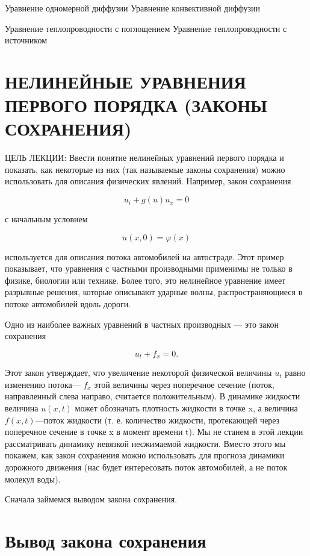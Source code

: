 \documentclass[
  ukrainian,
]{article}
\begin{document}
Уравнение одномерной диффузии Уравнение конвективной диффузии

Уравнение теплопроводности с поглощением Уравнение теплопроводности с
источником

\section{НЕЛИНЕЙНЫЕ УРАВНЕНИЯ ПЕРВОГО ПОРЯДКА (ЗАКОНЫ
СОХРАНЕНИЯ)}\label{ux43dux435ux43bux438ux43dux435ux439ux43dux44bux435-ux443ux440ux430ux432ux43dux435ux43dux438ux44f-ux43fux435ux440ux432ux43eux433ux43e-ux43fux43eux440ux44fux434ux43aux430-ux437ux430ux43aux43eux43dux44b-ux441ux43eux445ux440ux430ux43dux435ux43dux438ux44f}

ЦЕЛЬ ЛЕКЦИИ: Ввести понятие нелинейных уравнений первого порядка и
показать, как некоторые из них (так называемые законы сохранения) можно
использовать для описания физических явлений. Например, закон сохранения

\[
u_i + g(u)u_x = 0
\]

с начальным условием

\[
u(x, 0) = \varphi(x)
\]

используется для описания потока автомобилей на автостраде. Этот пример
показывает, что уравнения с частными производными применимы не только в
физике, биологии или технике. Более того, это нелинейное уравнение имеет
разрывные решения, которые описывают ударные волны, распространяющиеся в
потоке автомобилей вдоль дороги.

Одно из наиболее важных уравнений в частных производных --- это закон
сохранения

\[
u_t + f_x = 0.
\]

Этот закон утверждает, что увеличение некоторой физической величины
\(u_t\) равно изменению потока--- \(f_x\) этой величины через поперечное
сечение (поток, направленный слева направо, считается положительным). В
динамике жидкости величина \(u(x,t)\) может обозначать плотность
жидкости в точке x, а величина \(f(x,t)\)---поток жидкости (т. е.
количество жидкости, протекающей через поперечное сечение в точке x в
момент времени t). Мы не станем в этой лекции рассматривать динамику
невязкой несжимаемой жидкости. Вместо этого мы покажем, как закон
сохранения можно использовать для прогноза динамики дорожного движения
(нас будет интересовать поток автомобилей, а не поток молекул воды).

Сначала займемся выводом закона сохранения.

\section{Вывод закона
сохранения}\label{ux432ux44bux432ux43eux434-ux437ux430ux43aux43eux43dux430-ux441ux43eux445ux440ux430ux43dux435ux43dux438ux44f}
\end{document}
